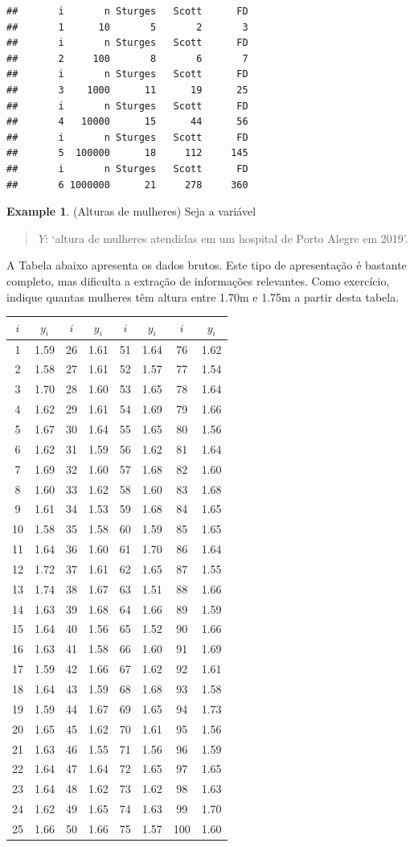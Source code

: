 \documentclass[
]{book}
\theoremstyle{definition}
\theoremstyle{definition}
\newtheorem{example}{Example}[chapter]
\theoremstyle{definition}
\theoremstyle{remark}
\begin{document}
\begin{verbatim}
##       i       n Sturges   Scott      FD 
##       1      10       5       2       3 
##       i       n Sturges   Scott      FD 
##       2     100       8       6       7 
##       i       n Sturges   Scott      FD 
##       3    1000      11      19      25 
##       i       n Sturges   Scott      FD 
##       4   10000      15      44      56 
##       i       n Sturges   Scott      FD 
##       5  100000      18     112     145 
##       i       n Sturges   Scott      FD 
##       6 1000000      21     278     360
\end{verbatim}

\begin{example}
\protect\hypertarget{exm:altura-mulheres}{}{\label{exm:altura-mulheres} }(Alturas de mulheres) Seja a variável

\begin{quote}
\(Y\): `altura de mulheres atendidas em um hospital de Porto Alegre em 2019'.
\end{quote}

A Tabela abaixo apresenta os dados brutos. Este tipo de apresentação é bastante completo, mas dificulta a extração de informações relevantes. Como exercício, indique quantas mulheres têm altura entre 1.70m e 1.75m a partir desta tabela.

\begin{longtable}[]{@{}cccccccc@{}}
\toprule
\(i\) & \(y_{i}\) & \(i\) & \(y_{i}\) & \(i\) & \(y_{i}\) & \(i\) & \(y_{i}\)\tabularnewline
\midrule
\endhead
1 & 1.59 & 26 & 1.61 & 51 & 1.64 & 76 & 1.62\tabularnewline
2 & 1.58 & 27 & 1.61 & 52 & 1.57 & 77 & 1.54\tabularnewline
3 & 1.70 & 28 & 1.60 & 53 & 1.65 & 78 & 1.64\tabularnewline
4 & 1.62 & 29 & 1.61 & 54 & 1.69 & 79 & 1.66\tabularnewline
5 & 1.67 & 30 & 1.64 & 55 & 1.65 & 80 & 1.56\tabularnewline
6 & 1.62 & 31 & 1.59 & 56 & 1.62 & 81 & 1.64\tabularnewline
7 & 1.69 & 32 & 1.60 & 57 & 1.68 & 82 & 1.60\tabularnewline
8 & 1.60 & 33 & 1.62 & 58 & 1.60 & 83 & 1.68\tabularnewline
9 & 1.61 & 34 & 1.53 & 59 & 1.68 & 84 & 1.65\tabularnewline
10 & 1.58 & 35 & 1.58 & 60 & 1.59 & 85 & 1.65\tabularnewline
11 & 1.64 & 36 & 1.60 & 61 & 1.70 & 86 & 1.64\tabularnewline
12 & 1.72 & 37 & 1.61 & 62 & 1.65 & 87 & 1.55\tabularnewline
13 & 1.74 & 38 & 1.67 & 63 & 1.51 & 88 & 1.66\tabularnewline
14 & 1.63 & 39 & 1.68 & 64 & 1.66 & 89 & 1.59\tabularnewline
15 & 1.64 & 40 & 1.56 & 65 & 1.52 & 90 & 1.66\tabularnewline
16 & 1.63 & 41 & 1.58 & 66 & 1.60 & 91 & 1.69\tabularnewline
17 & 1.59 & 42 & 1.66 & 67 & 1.62 & 92 & 1.61\tabularnewline
18 & 1.64 & 43 & 1.59 & 68 & 1.68 & 93 & 1.58\tabularnewline
19 & 1.59 & 44 & 1.67 & 69 & 1.65 & 94 & 1.73\tabularnewline
20 & 1.65 & 45 & 1.62 & 70 & 1.61 & 95 & 1.56\tabularnewline
21 & 1.63 & 46 & 1.55 & 71 & 1.56 & 96 & 1.59\tabularnewline
22 & 1.64 & 47 & 1.64 & 72 & 1.65 & 97 & 1.65\tabularnewline
23 & 1.64 & 48 & 1.62 & 73 & 1.62 & 98 & 1.63\tabularnewline
24 & 1.62 & 49 & 1.65 & 74 & 1.63 & 99 & 1.70\tabularnewline
25 & 1.66 & 50 & 1.66 & 75 & 1.57 & 100 & 1.60\tabularnewline
\bottomrule
\end{longtable}


\end{example}
\end{document}
